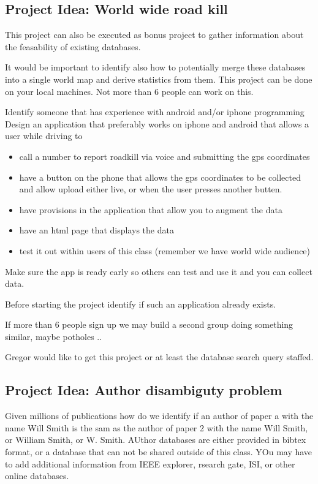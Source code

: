 \subsection{Project Idea: World wide road
kill}\label{project-idea-world-wide-road-kill}

This project can also be executed as bonus project to gather information
about the feasability of existing databases.

It would be important to identify also how to potentially merge these
databases into a single world map and derive statistics from them. This
project can be done on your local machines. Not more than 6 people can
work on this.

Identify someone that has experience with android and/or iphone
programming Design an application that preferably works on iphone and
android that allows a user while driving to

\begin{itemize}
\tightlist
\item
  call a number to report roadkill via voice and submitting the gps
  coordinates
\item
  have a button on the phone that allows the gps coordinates to be
  collected and allow upload either live, or when the user presses
  another butten.
\item
  have provisions in the application that allow you to augment the data
\item
  have an html page that displays the data
\item
  test it out within users of this class (remember we have world wide
  audience)
\end{itemize}

Make sure the app is ready early so others can test and use it and you
can collect data.

Before starting the project identify if such an application already
exists.

If more than 6 people sign up we may build a second group doing
something similar, maybe potholes ..

Gregor would like to get this project or at least the database search
query staffed.

\subsection{Project Idea: Author disambiguty
problem}\label{project-idea-author-disambiguty-problem}

Given millions of publications how do we identify if an author of paper
a with the name Will Smith is the sam as the author of paper 2 with the
name Will Smith, or William Smith, or W. Smith. AUthor databases are
either provided in bibtex format, or a database that can not be shared
outside of this class. YOu may have to add additional information from
IEEE explorer, rsearch gate, ISI, or other online databases.

